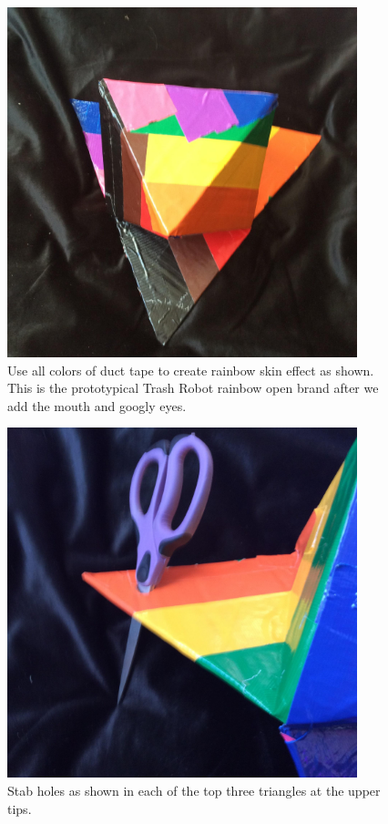 \begin{figure}
	\centering
	\includegraphics[width=4in]{figures/trashrobot/artboxrainbowskin.jpg}
	\caption[artboxrainbowskin]
	{Use all colors of duct tape to create rainbow skin effect as shown. This is the prototypical Trash Robot rainbow open brand after we add the mouth and googly eyes.} 
\end{figure}

\begin{figure}
	\centering
	\includegraphics[width=4in]{figures/trashrobot/artboxhole.jpg}
	\caption[artboxhole]
	{Stab holes as shown in each of the top three triangles at the upper tips.}
\end{figure}

